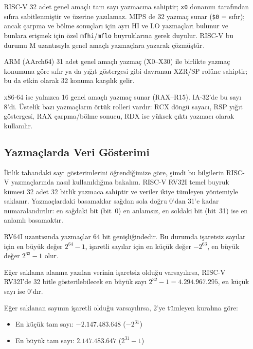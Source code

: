 \begin{karsilastirma}
RISC-V 32 adet genel amaçlı tam sayı yazmacına sahiptir; \texttt{x0} donanım tarafından sıfıra sabitlenmiştir ve üzerine yazılamaz. MIPS de 32 yazmaç sunar (\texttt{\$0} = sıfır); ancak çarpma ve bölme sonuçları için ayrı HI ve LO yazmaçları bulunur ve bunlara erişmek için özel \texttt{mfhi}/\texttt{mflo} buyruklarına gerek duyulur. RISC-V bu durumu M uzantısıyla genel amaçlı yazmaçlara yazarak çözmüştür.

ARM (AArch64) 31 adet genel amaçlı yazmaç (X0--X30) ile birlikte yazmaç konumuna göre sıfır ya da yığıt göstergesi gibi davranan XZR/SP rolüne sahiptir; bu da etkin olarak 32 konuma karşılık gelir.

x86-64 ise yalnızca 16 genel amaçlı yazmaç sunar (RAX--R15). IA-32'de bu sayı 8'di. Üstelik bazı yazmaçların örtük rolleri vardır: RCX döngü sayacı, RSP yığıt göstergesi, RAX çarpma/bölme sonucu, RDX ise yüksek çıktı yazmacı olarak kullanılır.
\end{karsilastirma}

\subsection{Yazmaçlarda Veri Gösterimi}
\label{sec:riscv-veri}

İkilik tabandaki sayı gösterimlerini öğrendiğimize göre, şimdi bu bilgilerin RISC-V yazmaçlarında nasıl kullanıldığına bakalım. RISC-V RV32I temel buyruk kümesi 32 adet 32 bitlik yazmaca sahiptir ve veriler ikiye tümleyen yöntemiyle saklanır. Yazmaçlardaki basamaklar sağdan sola doğru 0'dan 31'e kadar numaralandırılır: en sağdaki bit (bit~0) en anlamsız, en soldaki bit (bit~31) ise en anlamlı basamaktır.

\begin{bilginot}
RV64I uzantısında yazmaçlar 64 bit genişliğindedir. Bu durumda işaretsiz sayılar için en büyük değer $2^{64}-1$, işaretli sayılar için en küçük değer $-2^{63}$, en büyük değer $2^{63}-1$ olur.
\end{bilginot}

Eğer saklama alanına yazılan verinin işaretsiz olduğu varsayılırsa, RISC-V RV32I'de 32 bitle gösterilebilecek en büyük sayı $2^{32}-1 = 4.294.967.295$, en küçük sayı ise $0$'dır.

Eğer saklanan sayının işaretli olduğu varsayılırsa, 2'ye tümleyen kuralına göre:
\begin{itemize}
\item En küçük tam sayı: $-2.147.483.648$ ($-2^{31}$)
\item En büyük tam sayı: $2.147.483.647$ ($2^{31}-1$)
\end{itemize}

